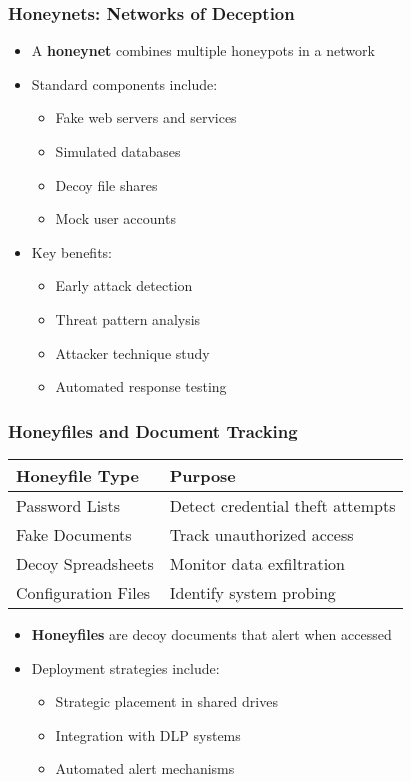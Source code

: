 \documentclass{beamer}
\begin{document}
\begin{frame}
    \frametitle{Honeynets: Networks of Deception}
    \begin{itemize}
        \item A \textbf{honeynet} combines multiple honeypots in a network
        \item Standard components include:
          \begin{itemize}
            \item Fake web servers and services
            \item Simulated databases
            \item Decoy file shares
            \item Mock user accounts
          \end{itemize}
        \item Key benefits:
          \begin{itemize}
            \item Early attack detection
            \item Threat pattern analysis
            \item Attacker technique study
            \item Automated response testing
          \end{itemize}
    \end{itemize}
\end{frame}

\begin{frame}
    \frametitle{Honeyfiles and Document Tracking}
    \begin{table}
        \begin{tabular}{|p{}|p{}|}
            \hline
            \textbf{Honeyfile Type} & \textbf{Purpose} \\
            \hline
            Password Lists & Detect credential theft attempts \\
            \hline
            Fake Documents & Track unauthorized access \\
            \hline
            Decoy Spreadsheets & Monitor data exfiltration \\
            \hline
            Configuration Files & Identify system probing \\
            \hline
        \end{tabular}
    \end{table}
    \begin{itemize}
        \item \textbf{Honeyfiles} are decoy documents that alert when accessed
        \item Deployment strategies include:
          \begin{itemize}
            \item Strategic placement in shared drives
            \item Integration with DLP systems
            \item Automated alert mechanisms
          \end{itemize}
    \end{itemize}
\end{frame}
\end{document}
